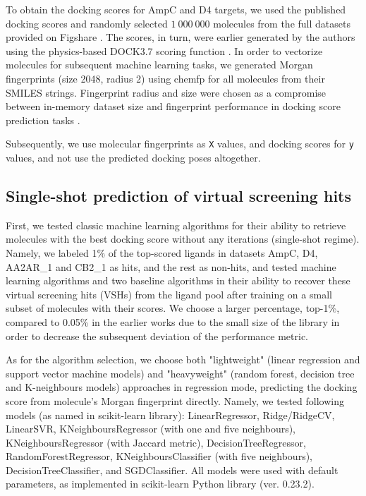 To obtain the docking scores for AmpC and D4 targets, we used the published docking scores \cite{ultralarge_docking_first} and randomly selected $1\ 000\ 000$ molecules from the full datasets provided on Figshare \cite{ultralarge_docking_first}. The scores, in turn, were earlier generated by the authors using the physics-based DOCK3.7 scoring function \cite{Coleman2013}.
In order to vectorize molecules for subsequent machine learning tasks, we generated Morgan fingerprints (size 2048, radius 2) using chemfp \cite{Dalke2019} for all molecules from their SMILES strings. Fingerprint radius and size were chosen as a compromise between in-memory dataset size and fingerprint performance in docking score prediction tasks \cite{logistic_regression}.

Subsequently, we use molecular fingerprints as \texttt{X} values, and docking scores for \texttt{y} values, and not use the predicted docking poses altogether.

\subsection{Single-shot prediction of virtual screening hits}
First, we tested classic machine learning algorithms for their ability to retrieve molecules with the best docking score without any iterations (single-shot regime). Namely, we labeled 1\% of the top-scored ligands in datasets AmpC, D4, AA2AR\_1 and CB2\_1 as hits, and the rest as non-hits, and tested machine learning algorithms and two baseline algorithms in their ability to recover these virtual screening hits (VSHs) from the ligand pool after training on a small subset of molecules with their scores. We choose a larger percentage, top-1\%, compared to 0.05\% in the earlier works  \cite{Graff2021AcceleratingLearning, logistic_regression, Yang2021_shoichet_active_learning} due to the small size of the library in order to decrease the subsequent deviation of the performance metric.

As for the algorithm selection, we choose both "lightweight" (linear regression and support vector machine models) and "heavyweight" (random forest, decision tree and K-neighbours models) approaches in regression mode, predicting the docking score from molecule's Morgan fingerprint directly. Namely, we tested following models (as named in scikit-learn library): LinearRegressor, Ridge/RidgeCV, LinearSVR, KNeighboursRegressor (with one and five neighbours), KNeighboursRegressor (with Jaccard metric), DecisionTreeRegressor, RandomForestRegressor, KNeighboursClassifier (with five neighbours), DecisionTreeClassifier, and SGDClassifier. All models were used with default parameters, as implemented in scikit-learn Python library \cite{scikit-learn} (ver. 0.23.2).

